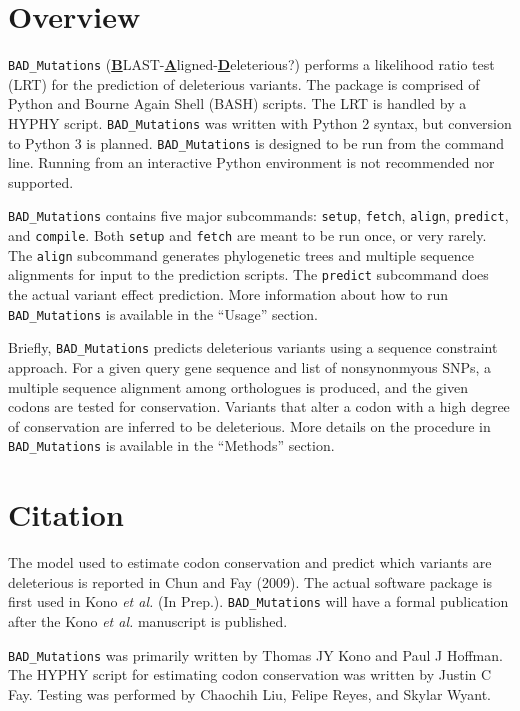 \documentclass[12pt]{article}
\newcommand{\BM}{\texttt{BAD\_Mutations} }
\begin{document}
\section*{Overview}
\par \BM (\textbf{\underline{B}}LAST-\textbf{\underline{A}}ligned-\textbf{\underline{D}}eleterious?)
performs a likelihood ratio test (LRT) for the prediction of deleterious
variants. The package is comprised of Python and Bourne Again Shell (BASH) scripts.
The LRT is handled by a HYPHY script. \BM was written with Python 2 syntax, but
conversion to Python 3 is planned. \BM is designed to be run from the command
line. Running from an interactive Python environment is not recommended nor
supported.

\par \BM contains five major subcommands: \texttt{setup}, \texttt{fetch}, 
\texttt{align}, \texttt{predict}, and \texttt{compile}. Both \texttt{setup} and
\texttt{fetch} are meant to be run once, or very rarely. The \texttt{align}
subcommand generates phylogenetic trees and multiple sequence alignments for
input to the prediction scripts. The \texttt{predict} subcommand does the actual
variant effect prediction. More information about how to run \BM is available
in the ``Usage'' section.

\par Briefly, \BM predicts deleterious variants using a sequence constraint
approach. For a given query gene sequence and list of nonsynonmyous SNPs, a
multiple sequence alignment among orthologues is produced, and the given codons
are tested for conservation. Variants that alter a codon with a high degree of
conservation are inferred to be deleterious. More details on the procedure in
\BM is available in the ``Methods'' section.

\section*{Citation}
\par The model used to estimate codon conservation and predict which variants
are deleterious is reported in Chun and Fay (2009). The actual software package
is first used in Kono \textit{et al.} (In Prep.). \BM will have a formal
publication after the Kono \textit{et al.} manuscript is published.

\par \BM was primarily written by Thomas JY Kono and Paul J Hoffman. The HYPHY
script for estimating codon conservation was written by Justin C Fay. Testing
was performed by Chaochih Liu, Felipe Reyes, and Skylar Wyant.
\end{document}
